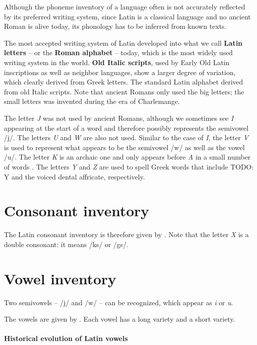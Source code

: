\documentclass[a4paper, oneside, 12pt]{report}
\newcommand*{\citechap}[1]{chap.~{#1}}
\newcommand*{\citetable}[1]{Table~{#1}}
\newcommand*{\concept}[1]{\textbf{#1}}
\newcommand{\form}[1]{\emph{#1}}
\begin{document}
Although the phoneme inventory of a language 
often is not accurately reflected by its preferred writing system, 
since Latin is a classical language 
and no ancient Roman is alive today, 
its phonology has to be inferred from known texts. 

The most accepted writing system of Latin developed into 
what we call \concept{Latin letters} -- or the \concept{Roman alphabet} -- today, 
which is the most widely used writing system in the world.
\concept{Old Italic scripts},
used by Early Old Latin inscriptions 
as well as neighbor languages,
show a larger degree of variation, 
which clearly derived from Greek letters.
The standard Latin alphabet derived from old Italic scripts.
Note that ancient Romans only used the big letters;
the small letters was invented during the era of Charlemange.

The letter \form{J} was not used by ancient Romans, 
although we sometimes see \form{I} appearing at the start of a word 
and therefore possibly represents the semivowel /j/.
The letters \form{U} and \form{W} are also not used.
Similar to the case of \form{I},
the letter \form{V} is used to represent 
what appears to be the semivowel /w/ 
as well as the vowel /u/. 
The letter \form{K} is an archaic one 
and only appears before \form{A} in a small number of words
\citep[\citechap{2}]{oniga2014latin}.
The letters \form{Y} and \form{Z} are used to spell Greek words that 
include TODO: Y and the voiced dental affricate, respectively.


\section{Consonant inventory}

The Latin consonant inventory is therefore given by \citet[\citetable{3.1}]{oniga2014latin}.
Note that the letter \form{X} is a double consonant: 
it means /ks/ or /gs/.

\section{Vowel inventory}

Two semivowels -- /j/ and /w/ -- can be recognized,
which appear as \form{i} or \form{u}.

The vowels are given by \citet[\citetable{3.2}]{oniga2014latin}.
Each vowel has a long variety and a short variety.

\paragraph*{Historical evolution of Latin vowels}
\end{document}
